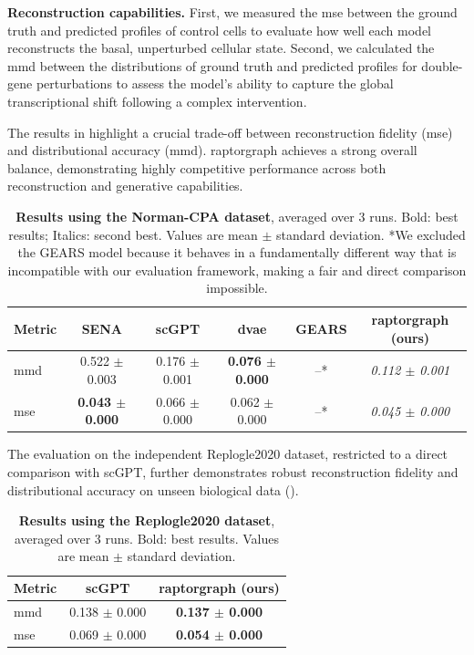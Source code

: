 \documentclass[10pt,letterpaper]{article}
\theoremstyle{definition}
\theoremstyle{remark}
\begin{document}
\textbf{Reconstruction capabilities.} First, we measured the \gls{mse} between the ground truth and predicted profiles of control cells to evaluate how well each model reconstructs the basal, unperturbed cellular state.
Second, we calculated the \gls{mmd} between the distributions of ground truth and predicted profiles for double-gene perturbations to assess the model's ability to capture the global transcriptional shift following a complex intervention.

The results in  highlight a crucial trade-off between reconstruction fidelity (\gls{mse}) and distributional accuracy (\gls{mmd}).
\Gls{raptorgraph} achieves a strong overall balance, demonstrating highly competitive performance across both reconstruction and generative capabilities.

\begin{table}[!ht]
\centering
\caption{\textbf{Results using the Norman-CPA dataset}, averaged over 3 runs. Bold: best results; Italics: second best. Values are mean $\pm$ standard deviation.
*We excluded the GEARS model because it behaves in a fundamentally different way that is incompatible with our evaluation framework, making a fair and direct comparison impossible.}
\begin{tabular}{lccccc}
\toprule
{Metric} & {SENA} & {scGPT} & {\gls{dvae}} & {GEARS} & {\gls{raptorgraph}} (ours) \\
\midrule
\gls{mmd} & 0.522 $\pm$ 0.003 & 0.176 $\pm$ 0.001 & \textbf{0.076 $\pm$ 0.000} & {--}* & \textit{0.112 $\pm$ 0.001} \\
\gls{mse} & \textbf{0.043 $\pm$ 0.000} & 0.066 $\pm$ 0.000 & 0.062 $\pm$ 0.000 & {--}* & \textit{0.045 $\pm$ 0.000} \\
\bottomrule
\end{tabular}
\label{tab:MMD_results}
\end{table}

The evaluation on the independent Replogle2020 dataset, restricted to a direct comparison with scGPT, further demonstrates robust reconstruction fidelity and distributional accuracy on unseen biological data ().

\begin{table}[!ht]
\centering
\caption{\textbf{Results using the Replogle2020 dataset}, averaged over 3 runs. Bold: best results. Values are mean $\pm$ standard deviation.}
\begin{tabular}{lcc}
\toprule
{Metric} & {scGPT} & {\gls{raptorgraph}} (ours) \\
\midrule
\gls{mmd} & 0.138 $\pm$ 0.000 & \textbf{0.137 $\pm$ 0.000} \\
\gls{mse} & 0.069 $\pm$ 0.000 & \textbf{0.054 $\pm$ 0.000} \\
\bottomrule
\end{tabular}
\label{tab:objective_results_replogle}
\end{table}
\end{document}
